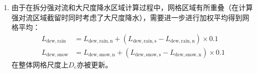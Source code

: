 \begin{enumerate}
  \item 由于在拆分强对流和大尺度降水区域计算过程中，网格区域有所重叠（在计算强对流区域截留时同时考虑了大尺度降水），需要进一步进行加权平均得到网格平均：
%
    \begin{equation}
      \begin{aligned}
        L_{\mathrm{dew,rain}} & = L_{\mathrm{dew,rain,n}} + (L_{\mathrm{dew,rain,s}} - L_{\mathrm{dew,rain,n}}) \times 0.1 \\
        L_{\mathrm{dew,snow}} & = L_{\mathrm{dew,snow,n}} + (L_{\mathrm{dew,snow,s}} - L_{\mathrm{dew,snow,n}}) \times 0.1
      \end{aligned}
    \end{equation}
%
    在整体网格尺度上$D_{\mathrm {c}} $亦被更新。

\end{enumerate}

